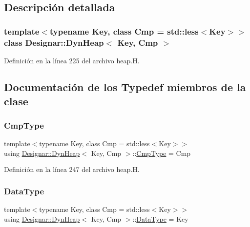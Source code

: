 \subsection{Descripción detallada}
\subsubsection*{template$<$typename Key, class Cmp = std\+::less$<$\+Key$>$$>$\newline
class Designar\+::\+Dyn\+Heap$<$ Key, Cmp $>$}



Definición en la línea 225 del archivo heap.\+H.



\subsection{Documentación de los \textquotesingle{}Typedef\textquotesingle{} miembros de la clase}
\mbox{\label{class_designar_1_1_dyn_heap_af4eef9bc99b80f175c541cabff5333e0}} 
\subsubsection{\texorpdfstring{Cmp\+Type}{CmpType}}
{\footnotesize\ttfamily template$<$typename Key, class Cmp = std\+::less$<$\+Key$>$$>$ \\
using \hyperlink{class_designar_1_1_dyn_heap}{Designar\+::\+Dyn\+Heap}$<$ Key, Cmp $>$\+::\hyperlink{class_designar_1_1_dyn_heap_af4eef9bc99b80f175c541cabff5333e0}{Cmp\+Type} =  Cmp}



Definición en la línea 247 del archivo heap.\+H.

\mbox{\label{class_designar_1_1_dyn_heap_aa4011e735cd33c5043f59ae43a2ce318}} 
\subsubsection{\texorpdfstring{Data\+Type}{DataType}}
{\footnotesize\ttfamily template$<$typename Key, class Cmp = std\+::less$<$\+Key$>$$>$ \\
using \hyperlink{class_designar_1_1_dyn_heap}{Designar\+::\+Dyn\+Heap}$<$ Key, Cmp $>$\+::\hyperlink{class_designar_1_1_fixed_array_a3e37931b909b840cb7a40fc73f12bcf5}{Data\+Type} =  Key}



